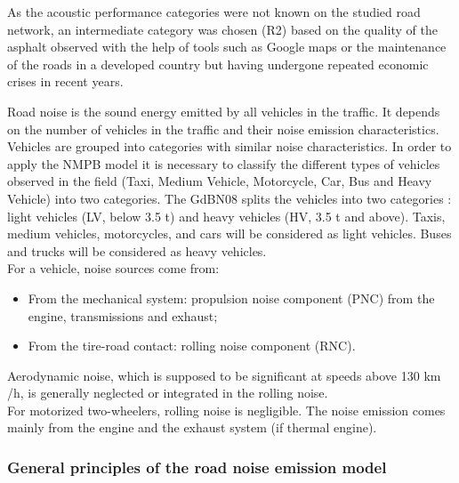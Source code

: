 \documentclass{article}
\begin{document}
{\color{red} \noindent As the acoustic performance categories were not known on the studied road network, an intermediate category was chosen (R2) based on the quality of the asphalt observed with the help of tools such as Google maps or the maintenance of the roads in a developed country but having undergone repeated economic crises in recent years.\\}

\noindent Road noise is the sound energy emitted by all vehicles in the traffic. It depends on the number of vehicles in the traffic and their noise emission characteristics. \\ 
\noindent Vehicles are grouped into categories with similar noise characteristics. {\color{red} In order to apply the NMPB model it is necessary to classify the different types of vehicles observed in the field (Taxi, Medium Vehicle, Motorcycle, Car, Bus and Heavy Vehicle) into two categories. The GdBN08 splits the vehicles into two categories : light vehicles (LV, below 3.5 t) and heavy vehicles (HV, 3.5 t and above). Taxis, medium vehicles, motorcycles, and cars will be considered as light vehicles. Buses and trucks will be considered as heavy vehicles.}\\

\noindent For a vehicle, noise sources come from:
\begin{itemize}
    \item From the mechanical system: propulsion noise component (PNC) from the engine, transmissions and exhaust;
    \item From the tire-road contact: rolling noise component (RNC). 
\end{itemize}

\noindent Aerodynamic noise, which is supposed to be significant at speeds above 130 km /h, is generally neglected or integrated in the rolling noise. \\

\noindent For motorized two-wheelers, rolling noise is negligible. The noise emission comes mainly from the engine and the exhaust system (if thermal engine).

\subsubsection{General principles of the road noise emission model}
\end{document}

